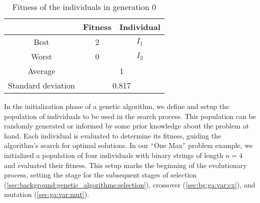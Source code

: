   \begin{table}[H]
    \centering
    \begin{tabular}{|c|c|c|}
      \hline
      & \textbf{Fitness} & \textbf{Individual}  \\
      \hline
      Best & 2 & \(I_1\) \\
      Worst & 0 & \(I_3\) \\
      \hline
      \hline
      Average & \multicolumn{2}{c|}{1} \\
      \hline
      Standard deviation & \multicolumn{2}{c|}{0.817} \\
      \hline
    \end{tabular}
    \caption{Fitness of the individuals in generation 0}
    \label{tab:genetic_algorithms:initialization:population_fitness}
  \end{table}
  
  In the initialization phase of a genetic algorithm, we define and setup the population of 
  individuals to be used in the search process. 
  This population can be randomly generated or informed by some prior knowledge about the problem at 
  hand. 
  Each individual is evaluated to determine its fitness, guiding the algorithm's search for optimal 
  solutions. 
  In our \enquote{One Max} problem example, we initialized a population of four individuals with 
  binary strings of length \(n = 4\) and evaluated their fitness. 
  This setup marks the beginning of the evolutionary process, setting the stage for the subsequent 
  stages of selection (\vref{sec:background:genetic_algorithms:selection}), 
  crossover (\vref{sec:bg:ga:var:cx}), and 
  mutation (\vref{sec:ga:var:mut}).
